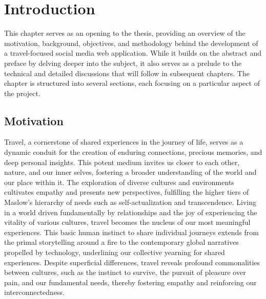 \chapter{Introduction}

\label{intro}

\par This chapter serves as an opening to the thesis, providing an overview of the motivation, background, objectives, and methodology behind the development of a travel-focused social media web application. While it builds on the abstract and preface by delving deeper into the subject, it also serves as a prelude to the technical and detailed discussions that will follow in subsequent chapters. The chapter is structured into several sections, each focusing on a particular aspect of the project.

\section{Motivation}

\par Travel, a cornerstone of shared experiences in the journey of life, serves as a dynamic conduit for the creation of enduring connections, precious memories, and deep personal insights. This potent medium invites us closer to each other, nature, and our inner selves, fostering a broader understanding of the world and our place within it. The exploration of diverse cultures and environments cultivates empathy and presents new perspectives, fulfilling the higher tiers of Maslow's hierarchy of needs such as self-actualization and transcendence. Living in a world driven fundamentally by relationships and the joy of experiencing the vitality of various cultures, travel becomes the nucleus of our most meaningful experiences. This basic human instinct to share individual journeys extends from the primal storytelling around a fire to the contemporary global narratives propelled by technology, underlining our collective yearning for shared experiences. Despite superficial differences, travel reveals profound commonalities between cultures, such as the instinct to survive, the pursuit of pleasure over pain, and our fundamental needs, thereby fostering empathy and reinforcing our interconnectedness.



